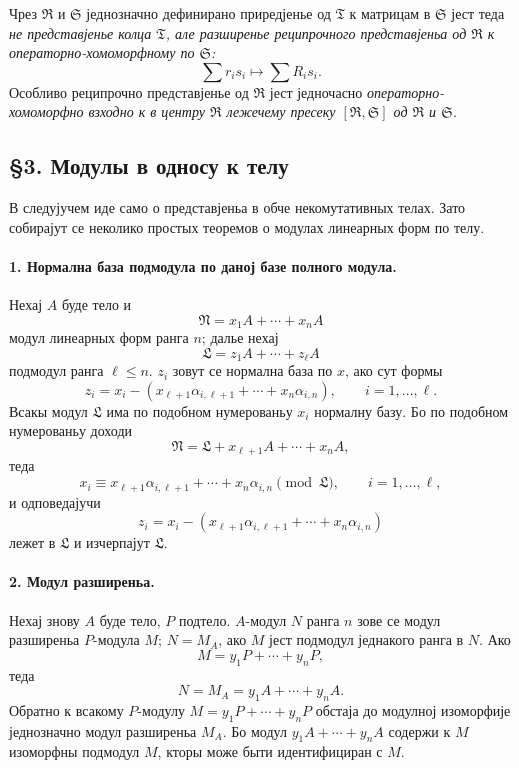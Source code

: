 ﻿\documentclass[11pt]{article}
\providecommand{\frL}{\mathfrak L}
\providecommand{\frN}{\mathfrak N}
\providecommand{\frR}{\mathfrak R}
\providecommand{\frS}{\mathfrak S}
\providecommand{\frT}{\mathfrak T}
\begin{document}
Чрез \(\frR\) и \(\frS\) једнозначно дефинирано приредјенье од \(\frT\) к матрицам в \(\frS\) јест теда \emph{не представјенье колца \(\frT\), але разширенье реципрочного представјеньа од \(\frR\) к операторно-хомоморфному по \(\frS\):}
\[
        \sum r_i s_i\longmapsto \sum R_i s_i.
\]
Особливо реципрочно представјенье од \(\frR\) јест једночасно \emph{операторно-хомоморфно взходно к в центру \(\frR\) лежечему пресеку \([\frR,\frS]\) од \(\frR\) и \(\frS\).}

\subsection*{§3. Модулы в односу к телу}

В следујучем иде само о представјеньа в обче некомутативных телах. Зато собирајут се неколико простых теоремов о модулах линеарных форм по телу.

\paragraph{1. Нормална база подмодула по даној базе полного модула.}
Нехај \(A\) буде тело и
\[
        \frN=x_1A+\cdots+x_nA
\]
модул линеарных форм ранга \(n\); далье нехај
\[
        \frL=z_1A+\cdots+z_\ell A
\]
подмодул ранга \(\ell\le n\). \(z_i\) зовут се нормална база по \(x\), ако сут формы
\[
        z_i=x_i-(x_{\ell+1}\alpha_{i,\ell+1}+\cdots+x_n\alpha_{i,n}),
        \qquad i=1,\ldots,\ell.
\]
Всакы модул \(\frL\) има по подобном нумерованьу \(x_i\) нормалну базу. Бо по подобном нумерованьу доходи
\[
        \frN=\frL+x_{\ell+1}A+\cdots+x_nA,
\]
теда
\[
        x_i\equiv x_{\ell+1}\alpha_{i,\ell+1}+\cdots+x_n\alpha_{i,n}
        \pmod{\frL},\qquad i=1,\ldots,\ell,
\]
и одповедајучи
\[
        z_i=x_i-(x_{\ell+1}\alpha_{i,\ell+1}+\cdots+x_n\alpha_{i,n})
\]
лежет в \(\frL\) и изчерпајут \(\frL\).

\paragraph{2. Модул разширеньа.}
Нехај знову \(A\) буде тело, \(P\) подтело. \(A\)-модул \(N\) ранга \(n\) зове се модул разширеньа \(P\)-модула \(M\); \(N=M_A\), ако \(M\) јест подмодул једнакого ранга в \(N\). Ако
\[
        M=y_1P+\cdots+y_nP,
\]
теда
\[
        N=M_A=y_1A+\cdots+y_nA.
\]
Обратно к всакому \(P\)-модулу \(M=y_1P+\cdots+y_nP\) обстаја до модулној изоморфије једнозначно модул разширеньа \(M_A\). Бо модул \(y_1A+\cdots+y_nA\) содержи к \(M\) изоморфны подмодул \(M\), кторы може быти идентифициран с \(M\).
\end{document}
